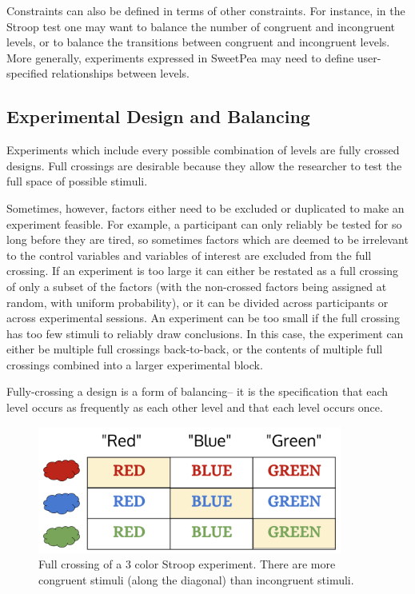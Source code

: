Constraints can also be defined in terms of other constraints. For instance, in the Stroop test one may want to balance the number of congruent and incongruent levels, or to balance the transitions between congruent and incongruent levels. More generally, experiments expressed in SweetPea may need to define user-specified relationships between levels.

\subsection{Experimental Design and Balancing}

Experiments which include every possible combination of levels are fully crossed designs. Full crossings are desirable because they allow the researcher to test the full space of possible stimuli.

Sometimes, however, factors either need to be excluded or duplicated to make an experiment feasible. For example, a participant can only reliably be tested for so long before they are tired, so sometimes factors which are deemed to be irrelevant to the control variables and variables of interest are excluded from the full crossing. If an experiment is too large it can either be restated as a full crossing of only a subset of the factors (with the non-crossed factors being assigned at random, with uniform probability), or it can be divided across participants or across experimental sessions. An experiment can be too small if the full crossing has too few stimuli to reliably draw conclusions. In this case, the experiment can either be multiple full crossings back-to-back, or the contents of multiple full crossings combined into a larger experimental block.

Fully-crossing a design is a form of balancing-- it is the specification that each level occurs as frequently as each other level and that each level occurs once.

\begin{figure}[t]
    \centerline{\includegraphics[origin=c,width=10cm]{fig_weighted_crossing}}
    \caption{Full crossing of a 3 color Stroop experiment. There are more congruent stimuli (along the diagonal) than incongruent stimuli.}%
    \label{fig:weighted_crossing}%
\end{figure}

